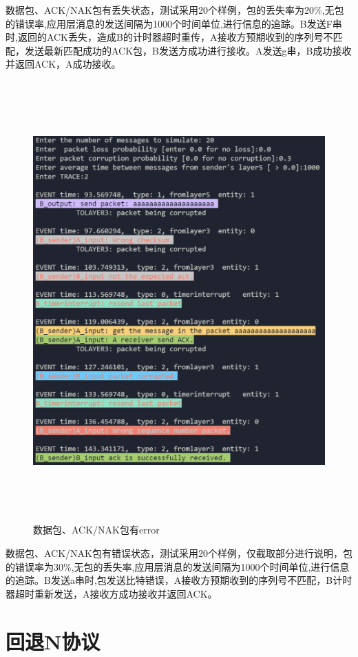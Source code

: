 \documentclass[UTF8,14pt]{article}
\numberwithin{figure}{section}
\begin{document}
数据包、ACK/NAK包有丢失状态，测试采用20个样例，包的丢失率为20\%,无包的错误率,应用层消息的发送间隔为1000个时间单位,进行信息的追踪。B发送F串时,返回的ACK丢失，造成B的计时器超时重传，A接收方预期收到的序列号不匹配，发送最新匹配成功的ACK包，B发送方成功进行接收。A发送g串，B成功接收并返回ACK，A成功接收。
\newpage
\begin{figure}[!htbp]
      \centering
      \includegraphics[width=15cm,height=16.85cm]{result4_1.png}
      \caption{数据包、ACK/NAK包有error}
\end{figure}

数据包、ACK/NAK包有错误状态，测试采用20个样例，仅截取部分进行说明，包的错误率为30\%,无包的丢失率,应用层消息的发送间隔为1000个时间单位,进行信息的追踪。B发送a串时,包发送比特错误，A接收方预期收到的序列号不匹配，B计时器超时重新发送，A接收方成功接收并返回ACK。
\clearpage
\section{回退N协议}
\end{document}

